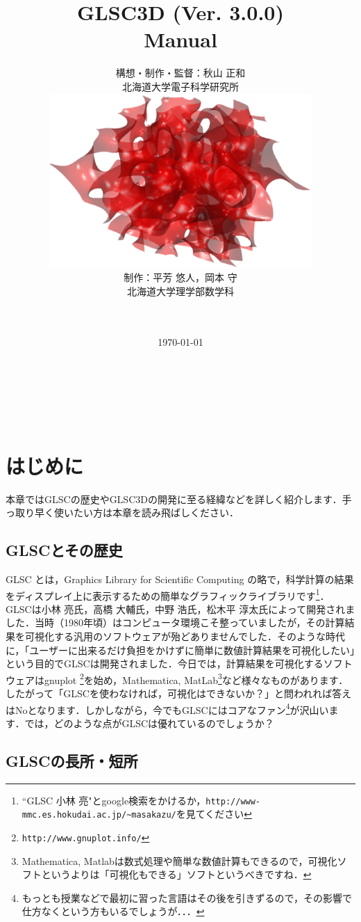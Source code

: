 \documentclass[a4paper,12pt]{jsarticle}%
\title{\vspace{10mm}\Huge{GLSC3D (Ver. 3.0.0) \\Manual}}
\author{\Large{構想・制作・監督：秋山 正和}\\\vspace{5mm}
北海道大学電子科学研究所\\
	\includegraphics[width=100mm]{Figures/eps/CoverPage.eps}\\
\Large{制作：平芳 悠人，岡本 守}\\
北海道大学理学部数学科\\
\\
\\
\date{\today}
}
\begin{document}
\maketitle
\thispagestyle{empty}


\newpage
\thispagestyle{empty}
　
\newpage

\setcounter{tocdepth}{3}
\tableofcontents

\newpage
\thispagestyle{empty}
　
\newpage

\section{はじめに}

本章ではGLSCの歴史やGLSC3Dの開発に至る経緯などを詳しく紹介します．手っ取り早く使いたい方は本章を読み飛ばしください．

\subsection{GLSCとその歴史}

GLSC とは，Graphics Library for Scientific Computing の略で，科学計算の結果をディスプレイ上に表示するための簡単なグラフィックライブラリです\footnote{``GLSC 小林 亮"とgoogle検索をかけるか，\verb|http://www-mmc.es.hokudai.ac.jp/~masakazu/|を見てください}．GLSCは小林 亮氏，高橋 大輔氏，中野 浩氏，松木平 淳太氏によって開発されました．当時（1980年頃）はコンピュータ環境こそ整っていましたが，その計算結果を可視化する汎用のソフトウェアが殆どありませんでした．そのような時代に，「ユーザーに出来るだけ負担をかけずに簡単に数値計算結果を可視化したい」という目的でGLSCは開発されました．今日では，計算結果を可視化するソフトウェアはgnuplot \footnote{\verb|http://www.gnuplot.info/|}を始め，Mathematica, MatLab\footnote{Mathematica, Matlabは数式処理や簡単な数値計算もできるので，可視化ソフトというよりは「可視化もできる」ソフトというべきですね．}など様々なものがあります．したがって「GLSCを使わなければ，可視化はできないか？」と問われれば答えはNoとなります．しかしながら，今でもGLSCにはコアなファン\footnote{もっとも授業などで最初に習った言語はその後を引きずるので，その影響で仕方なくという方もいるでしょうが．．．}が沢山います．では，どのような点がGLSCは優れているのでしょうか？

\subsection{GLSCの長所・短所}
\end{document}
